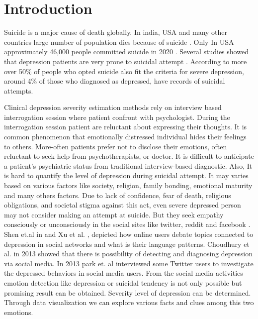 \documentclass[sn-mathphys,Numbered]{sn-jnl}%
\theoremstyle{thmstyleone}%
\theoremstyle{thmstyletwo}%
\theoremstyle{thmstylethree}%
\begin{document}
\section{Introduction}\label{sec1}
Suicide is a major cause of death globally. In india, USA and many other countries large number of population dies because of suicide \cite{havigerova2019text, singh2022startling}. Only In USA approximately 46,000 people committed suicide in 2020 \cite{singh2022startling}. Several studies showed that depression patients are very prone to suicidal attempt \cite{vuorilehto2006suicidal, mcgirr2007examination, hawton2013risk}. According to \cite{singh2022startling} more over 50\% of people who opted suicide also fit the criteria for severe depression, around 4\% of those who diagnosed as depressed, have records of suicidal attempts. 

Clinical depression severity estimation methods rely on interview based interrogation session where patient confront with psychologist. During the interrogation session patient are reluctant about expressing their thoughts. It is common phenomenon that emotionally distressed individual hides their feelings to others. More-often patients prefer not to disclose their emotions, often reluctant to seek help from psychotherapists, or doctor. It is difficult to anticipate a patient's psychiatric status from traditional interview-based diagnostic. Also, It is hard to quantify the level of depression during suicidal attempt. It may varies based on various factors like society, religion, family bonding, emotional maturity and many others factors. Due to lack of confidence, fear of death, religious obligations, and societal stigma against this act, even severe depressed person may not consider making an attempt at suicide. But they seek empathy consciously or unconsciously in the social sites like twitter, reddit and facebook \cite{chen2018}. Shen et.al in \cite{shen2017depression} and Xu et al. \cite{xu2016contribution}, depicted how online users debate topics connected to depression in social networks and what is their language patterns. Choudhury et al. in 2013 \cite{de2013predicting} showed that there is possibility of detecting and diagnosing depression via social media. In 2013 park et. al \cite{park2013perception} interviewed some Twitter users to investigate the depressed behaviors in social media users. From the social media activities emotion detection like depression or suicidal tendency is not only possible but promising result can be obtained. Severity level of depression can be determined. Through data visualization we can explore various facts and clues among this two emotions. 
\end{document}
